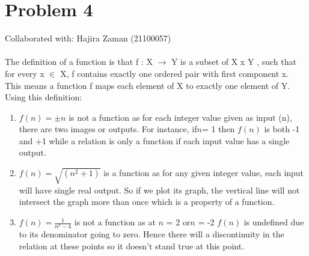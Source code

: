 \documentclass{article}
\begin{document}
\section{Problem 4}
Collaborated with: Hajira Zaman (21100057)\\\\
The definition of a function is that f : X $\rightarrow$ Y is a subset of X x Y , such that for every x $\in$ X, f contains exactly one ordered pair with first component x. This means a function f maps each element of X to exactly one element of Y. Using this definition:
\begin{enumerate}
\item %
$f(n) = \pm n$ is not a function as for each integer value given as input (n), there are two images or outputs. For instance, if$ n$= 1 then $f(n)$ is both -1 and +1 while a relation is only a function if each input value has a single output.

\item %
$f(n) = \sqrt{(n^2 + 1)}$ is a function as for any given integer value, each input will have single real output. So if we plot its graph, the vertical line will not intersect the graph more than once which is a property of a function. 


\item %
$f(n) =\frac{1}{n^2 - 4}$ is not a function as at $n$ = 2 or$n$ = -2 $f(n)$ is undefined due to its denominator going to zero. Hence there will a discontinuity in the relation at these points so it doesn't stand true at this point.

\end{enumerate}
\end{document}
